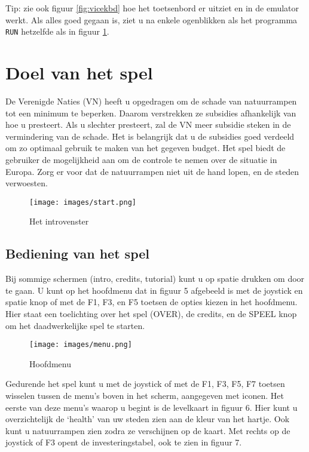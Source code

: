 \documentclass{article}
\begin{document}
Tip: zie ook figuur \ref{fig:vicekbd} hoe het toetsenbord er uitziet en in de emulator werkt.
Als alles goed gegaan is, ziet u na enkele ogenblikken als het programma \verb:RUN: hetzelfde als in figuur \ref{fig:start}.



\section{Doel van het spel}

De Verenigde Naties (VN) heeft u opgedragen om de schade van natuurrampen tot een minimum te beperken.
Daarom verstrekken ze subsidies afhankelijk van hoe u presteert.
Als u slechter presteert, zal de VN meer subsidie steken in de vermindering van de schade.
Het is belangrijk dat u de subsidies goed verdeeld om zo optimaal gebruik te maken van het gegeven budget. Het spel biedt de gebruiker de mogelijkheid aan om de controle te nemen over de situatie in Europa. Zorg er voor dat de natuurrampen niet uit de hand lopen, en  de steden verwoesten.

\begin{figure}[H]
\centering
\texttt{[image: images/start.png]}
\label{fig:start}
\caption{Het introvenster}
\end{figure}

\subsection{Bediening van het spel}

Bij sommige schermen (intro, credits, tutorial) kunt u op spatie drukken om door te gaan. U kunt op het hoofdmenu dat in figuur 5 afgebeeld is met de joystick en spatie knop of met de F1, F3, en F5 toetsen de opties kiezen in het hoofdmenu. Hier staat een toelichting over het spel (OVER), de credits, en de SPEEL knop om het daadwerkelijke spel te starten.

\begin{figure}[H]
\centering
\texttt{[image: images/menu.png]}
\label{fig:drip}
\caption{Hoofdmenu}
\end{figure}

Gedurende het spel kunt u met de joystick of met de F1, F3, F5, F7 toetsen wisselen tussen de menu's boven in het scherm, aangegeven met iconen. Het eerste van deze menu's waarop u begint is de levelkaart in figuur 6. Hier kunt u overzichtelijk de `health' van uw steden zien aan de kleur van het hartje. Ook kunt u natuurrampen zien zodra ze verschijnen op de kaart. Met rechts op de joystick of F3 opent de investeringstabel, ook te zien in figuur 7.
\end{document}
